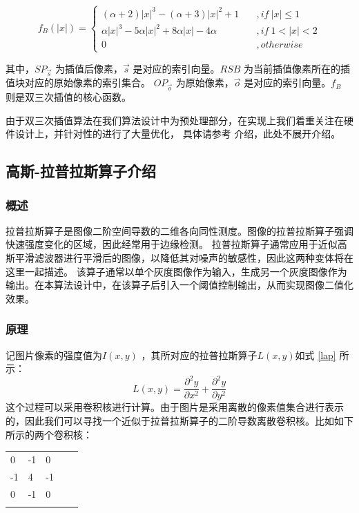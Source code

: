 \documentclass[12pt, a4paper, oneside]{ctexbook}
\begin{document}
	\begin{equation}
		f_B(|x|)=
		\begin{cases}
			(\alpha + 2)|x|^3-(\alpha+3)|x|^2+1\quad &,if\ |x| \leq1\\
			\alpha|x|^3-5\alpha|x|^2+8\alpha|x|-4\alpha\quad&,if \ 1<|x|<2\\
			0&,otherwise				
			\label{bicubic_2}
		\end{cases}
	\end{equation}
	\par
	其中，$SP_{\vec{s}}$ 为插值后像素，$\vec{s}$ 是对应的索引向量。$RSB$ 为当前插值像素所在的插值块对应的原始像素的索引集合。
	$OP_{\vec{o}}$ 为原始像素，$\vec{o}$ 是对应的索引向量。$f_B$ 则是双三次插值的核心函数。
	\par 由于双三次插值算法在我们算法设计中为预处理部分，在实现上我们着重关注在硬件设计上，并针对性的进行了大量优化，
	具体请参考 \textbf{} 介绍，此处不展开介绍。
	
	\subsection{高斯-拉普拉斯算子介绍}
	\subsubsection{概述}
	拉普拉斯算子是图像二阶空间导数的二维各向同性测度。图像的拉普拉斯算子强调快速强度变化的区域，因此经常用于边缘检测。
	拉普拉斯算子通常应用于近似高斯平滑滤波器进行平滑后的图像，以降低其对噪声的敏感性，因此这两种变体将在这里一起描述。
	该算子通常以单个灰度图像作为输入，生成另一个灰度图像作为输出。在本算法设计中，在该算子后引入一个阈值控制输出，从而实现图像二值化效果。
	\subsubsection{原理}
	记图片像素的强度值为$I(x,y)$ ，其所对应的拉普拉斯算子$L(x,y)$如式 \ref{lap} 所示：
	\begin{equation}	\label{lap}
		L(x,y)=\frac{\partial ^2 y}{\partial x^2} + \frac{\partial ^2 y}{\partial y^2}
	\end{equation}
	这个过程可以采用卷积核进行计算。由于图片是采用离散的像素值集合进行表示的，因此我们可以寻找一个近似于拉普拉斯算子的二阶导数离散卷积核。比如如下所示的两个卷积核：
	\begin{table}[h]
		\centering
		\begin{tabular}{lllll}
			\cline{1-3}
			\multicolumn{1}{|l|}{0}  & \multicolumn{1}{l|}{-1} & \multicolumn{1}{l|}{0}  &  &  \\ \cline{1-3}
			\multicolumn{1}{|l|}{-1} & \multicolumn{1}{l|}{4}  & \multicolumn{1}{l|}{-1} &  &  \\ \cline{1-3}
			\multicolumn{1}{|l|}{0}  & \multicolumn{1}{l|}{-1} & \multicolumn{1}{l|}{0}  &  &  \\ \cline{1-3}
			&                         &                         &  & 
		\end{tabular}
	\end{table}
	
\end{document}
